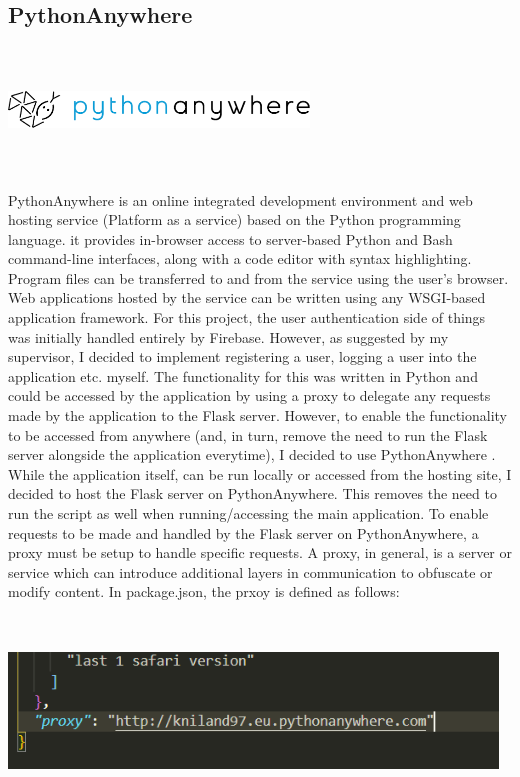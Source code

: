 \newpage
\subsection{PythonAnywhere}
\par
\medskip
\begin{center}
    \includegraphics[width=8cm,height=3.3cm,keepaspectratio]{images/pythonanywhere}
\end{center}
PythonAnywhere is an online integrated development environment and web
hosting service (Platform as a service) based on the Python programming 
language. it provides in-browser access to server-based Python and Bash 
command-line interfaces, along with a code editor with syntax highlighting. 
Program files can be transferred to and from the service using the user's 
browser. Web applications hosted by the service can be written using any 
WSGI-based application framework. For this project, the user authentication side
of things was initially handled entirely by Firebase. However, as suggested by 
my supervisor, I decided to implement registering a user, logging a user into 
the application etc. myself. The functionality for this was written in Python 
and could be accessed by the application by using a proxy to delegate any 
requests made by the application to the Flask server. However, to enable the 
functionality to be accessed from anywhere (and, in turn, remove the need to run
the Flask server alongside the application everytime), I decided to use 
PythonAnywhere \cite{flask_pa}. While the application itself, can be run locally or accessed from the hosting site, I decided to host the Flask server on PythonAnywhere. This removes the need to run the script as well when running/accessing the main application. To enable requests to be made and handled by the Flask server on PythonAnywhere, a proxy must be setup to handle specific requests. A proxy, in general, is a server or service which can introduce additional layers in communication to obfuscate or modify content. In package.json, the prxoy is defined as follows:

\begin{center}
    \includegraphics[width=13cm,height=5cm,keepaspectratio]{images/packagejson}
\end{center}

